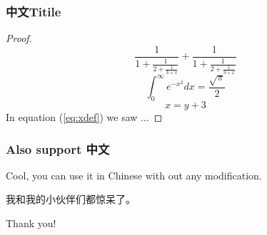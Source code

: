 \documentclass[aspectratio=169]{beamer}
\begin{document}
    \begin{frame}
        \frametitle{中文Titile}
        \begin{proof}
            $$
            \frac{1}{\displaystyle 1+
            \frac{1}{\displaystyle 2+
            \frac{1}{\displaystyle 3+x}}} +
            \frac{1}{1+\frac{1}{2+\frac{1}{3+x}}}
            $$
            $$\int_0^\infty e^{-x^2} dx=\frac{\sqrt{\pi}}{2}$$
            \begin{equation}
                x=y+3 \label{eq:xdef}
            \end{equation}
            In equation (\ref{eq:xdef}) we saw $\dots$
        \end{proof}
    \end{frame}
    \begin{frame}
        \frametitle{Also support 中文}
        Cool, you can use it in Chinese with out any modification.\par
        我和我的小伙伴们都惊呆了。
    \end{frame}
    \begin{frame}
        \begin{center}
            \LARGE{Thank you!}
        \end{center}
    \end{frame}
\end{document}
